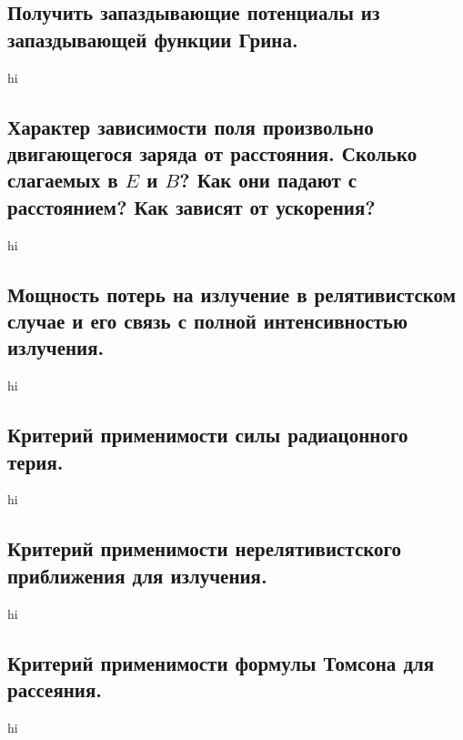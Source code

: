 \documentclass[a4paper,12pt]{article}
\begin{document}
\subsection{Получить запаздывающие потенциалы из запаздывающей функции Грина.}
hi
\subsection{Характер зависимости поля произвольно двигающегося заряда от
расстояния. Сколько слагаемых в $E$ и $B$? Как они падают с расстоянием?
Как зависят от ускорения?}
hi
\subsection{Мощность потерь на излучение в релятивистском случае и его связь
с полной интенсивностью излучения.}
hi
\subsection{Критерий применимости силы радиацонного терия.}
hi
\subsection{Критерий применимости нерелятивистского приближения для излучения.}
hi
\subsection{Критерий применимости формулы Томсона для рассеяния.}
hi
\end{document}
